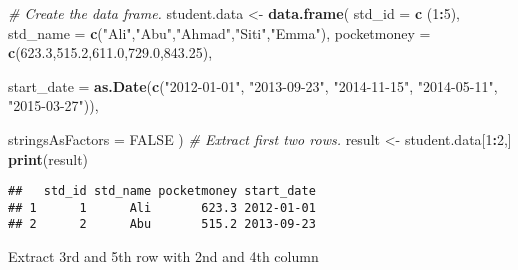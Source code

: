 \documentclass[
]{article}
\newenvironment{Shaded}{\begin{snugshade}}{\end{snugshade}}
\newcommand{\AttributeTok}[1]{\textcolor[rgb]{0.13,0.29,0.53}{#1}}
\newcommand{\CommentTok}[1]{\textcolor[rgb]{0.56,0.35,0.01}{\textit{#1}}}
\newcommand{\ConstantTok}[1]{\textcolor[rgb]{0.56,0.35,0.01}{#1}}
\newcommand{\DecValTok}[1]{\textcolor[rgb]{0.00,0.00,0.81}{#1}}
\newcommand{\FloatTok}[1]{\textcolor[rgb]{0.00,0.00,0.81}{#1}}
\newcommand{\FunctionTok}[1]{\textcolor[rgb]{0.13,0.29,0.53}{\textbf{#1}}}
\newcommand{\NormalTok}[1]{#1}
\newcommand{\OtherTok}[1]{\textcolor[rgb]{0.56,0.35,0.01}{#1}}
\newcommand{\SpecialCharTok}[1]{\textcolor[rgb]{0.81,0.36,0.00}{\textbf{#1}}}
\newcommand{\StringTok}[1]{\textcolor[rgb]{0.31,0.60,0.02}{#1}}
\begin{document}
\begin{Shaded}
\begin{Highlighting}[]
\CommentTok{\# Create the data frame.}
\NormalTok{student.data }\OtherTok{\textless{}{-}} \FunctionTok{data.frame}\NormalTok{(}
   \AttributeTok{std\_id =} \FunctionTok{c}\NormalTok{ (}\DecValTok{1}\SpecialCharTok{:}\DecValTok{5}\NormalTok{), }
   \AttributeTok{std\_name =} \FunctionTok{c}\NormalTok{(}\StringTok{"Ali"}\NormalTok{,}\StringTok{"Abu"}\NormalTok{,}\StringTok{"Ahmad"}\NormalTok{,}\StringTok{"Siti"}\NormalTok{,}\StringTok{"Emma"}\NormalTok{),}
   \AttributeTok{pocketmoney =} \FunctionTok{c}\NormalTok{(}\FloatTok{623.3}\NormalTok{,}\FloatTok{515.2}\NormalTok{,}\FloatTok{611.0}\NormalTok{,}\FloatTok{729.0}\NormalTok{,}\FloatTok{843.25}\NormalTok{), }
   
   \AttributeTok{start\_date =} \FunctionTok{as.Date}\NormalTok{(}\FunctionTok{c}\NormalTok{(}\StringTok{"2012{-}01{-}01"}\NormalTok{, }\StringTok{"2013{-}09{-}23"}\NormalTok{, }\StringTok{"2014{-}11{-}15"}\NormalTok{, }\StringTok{"2014{-}05{-}11"}\NormalTok{,}
      \StringTok{"2015{-}03{-}27"}\NormalTok{)),}

   \AttributeTok{stringsAsFactors =} \ConstantTok{FALSE}
\NormalTok{)}
\CommentTok{\# Extract first two rows.}
\NormalTok{result }\OtherTok{\textless{}{-}}\NormalTok{ student.data[}\DecValTok{1}\SpecialCharTok{:}\DecValTok{2}\NormalTok{,]}
\FunctionTok{print}\NormalTok{(result)}
\end{Highlighting}
\end{Shaded}

\begin{verbatim}
##   std_id std_name pocketmoney start_date
## 1      1      Ali       623.3 2012-01-01
## 2      2      Abu       515.2 2013-09-23
\end{verbatim}

Extract 3rd and 5th row with 2nd and 4th column
\end{document}

